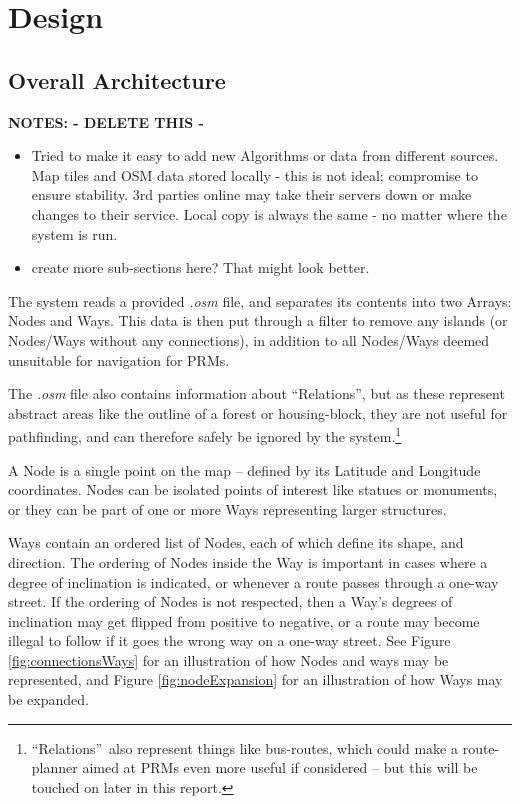 
\chapter{Design}

\section{Overall Architecture}
\textbf{NOTES: - DELETE THIS -}
\begin{itemize}
\item Tried to make it easy to add new Algorithms or data from different sources. Map tiles and OSM data stored locally - this is not ideal; compromise to ensure stability. 3rd parties online may take their servers down or make changes to their service. Local copy is always the same - no matter where the system is run.
\item create more sub-sections here? That might look better.
\end{itemize}

The system reads a provided \textit{.osm} file\cite{OSM-XML}, and separates its contents into two Arrays: Nodes and Ways. This data is then put through a filter to remove any islands (or Nodes/Ways without any connections), in addition to all Nodes/Ways deemed unsuitable for navigation for PRMs.

The \textit{.osm} file also contains information about \textquotedblleft Relations\textquotedblright, but as these represent abstract areas like the outline of a forest or housing-block, they are not useful for pathfinding, and can therefore safely be ignored by the system.\footnote{\textquotedblleft Relations\textquotedblright~also represent things like bus-routes, which could make a route-planner aimed at PRMs even more useful if considered -- but this will be touched on later in this report.}

A Node is a single point on the map -- defined by its Latitude and Longitude coordinates. Nodes can be isolated points of interest like statues or monuments, or they can be part of one or more Ways representing larger structures.

Ways contain an ordered list of Nodes, each of which define its shape, and direction. The ordering of Nodes inside the Way is important in cases where a degree of inclination is indicated, or whenever a route passes through a one-way street.
If the ordering of Nodes is not respected, then a Way's degrees of inclination may get flipped from positive to negative, or a route may become illegal to follow if it goes the wrong way on a one-way street. See Figure \ref{fig:connectionsWays} for an illustration of how Nodes and ways may be represented, and Figure \ref{fig:nodeExpansion} for an illustration of how Ways may be expanded.

